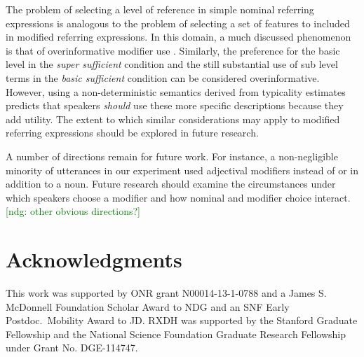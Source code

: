 \documentclass[10pt,letterpaper]{article}
\newcommand{\jd}[1]{\textcolor{Blue}{[jd: #1]}}
\newcommand{\ndg}[1]{\textcolor{Green}{[ndg: #1]}}
\begin{document}
The problem of selecting a level of reference in simple nominal referring expressions is analogous to the problem of selecting a set of features to included in modified referring expressions. In this domain, a much discussed phenomenon is that of overinformative modifier use \cite{Gatt2014}. Similarly, the preference for the basic level in the \emph{super sufficient} condition and the still substantial use of sub level terms in the \emph{basic sufficient} condition can be considered overinformative. However, using a non-deterministic semantics derived from typicality estimates predicts that speakers \emph{should} use these more specific descriptions because they add utility. The extent to which similar considerations may apply to modified referring expressions should be explored in future research.


A number of directions remain for future work.
For instance, a non-negligible minority of utterances in our experiment used adjectival modifiers instead of or in addition to a noun. 
Future research should examine the circumstances under which speakers choose a modifier and how nominal and modifier choice interact.
\ndg{other obvious directions?}

%

\section{\bf Acknowledgments}

This work was supported by ONR grant N00014-13-1-0788 and a James S. McDonnell Foundation Scholar Award to NDG and an SNF Early Postdoc.~Mobility Award to JD. RXDH was supported by the Stanford Graduate Fellowship and the National Science Foundation Graduate Research Fellowship under Grant No. DGE-114747.

\small




\setlength{\bibleftmargin}{.125in}
\setlength{\bibindent}{-\bibleftmargin}


\end{document}
